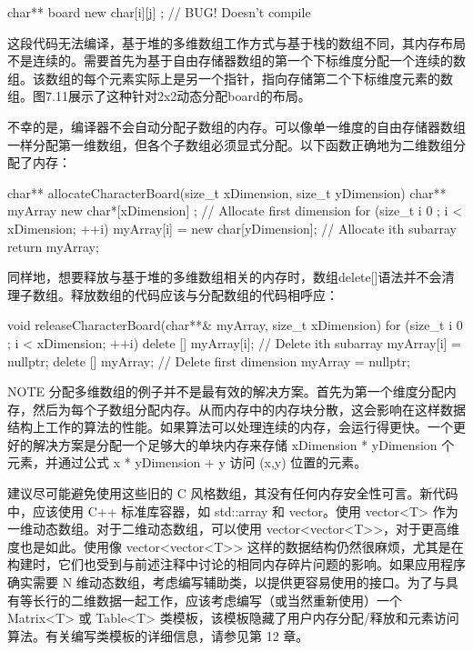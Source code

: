 \begin{cpp}
char** board { new char[i][j] }; // BUG! Doesn't compile
\end{cpp}

这段代码无法编译，基于堆的多维数组工作方式与基于栈的数组不同，其内存布局不是连续的。需要首先为基于自由存储器数组的第一个下标维度分配一个连续的数组。该数组的每个元素实际上是另一个指针，指向存储第二个下标维度元素的数组。图7.11展示了这种针对2x2动态分配board的布局。


不幸的是，编译器不会自动分配子数组的内存。可以像单一维度的自由存储器数组一样分配第一维数组，但各个子数组必须显式分配。以下函数正确地为二维数组分配了内存：

\begin{cpp}
char** allocateCharacterBoard(size_t xDimension, size_t yDimension)
{
    char** myArray { new char*[xDimension] }; // Allocate first dimension
    for (size_t i { 0 }; i < xDimension; ++i) {
        myArray[i] = new char[yDimension]; // Allocate ith subarray
    }
    return myArray;
}
\end{cpp}

同样地，想要释放与基于堆的多维数组相关的内存时，数组delete[]语法并不会清理子数组。释放数组的代码应该与分配数组的代码相呼应：

\begin{cpp}
void releaseCharacterBoard(char**& myArray, size_t xDimension)
{
    for (size_t i { 0 }; i < xDimension; ++i) {
        delete [] myArray[i]; // Delete ith subarray
        myArray[i] = nullptr;
    }
    delete [] myArray; // Delete first dimension
    myArray = nullptr;
}
\end{cpp}

\begin{myNotic}{NOTE}
分配多维数组的例子并不是最有效的解决方案。首先为第一个维度分配内存，然后为每个子数组分配内存。从而内存中的内存块分散，这会影响在这样数据结构上工作的算法的性能。如果算法可以处理连续的内存，会运行得更快。一个更好的解决方案是分配一个足够大的单块内存来存储 xDimension * yDimension 个元素，并通过公式 x * yDimension + y 访问 (x,y) 位置的元素。
\end{myNotic}

建议尽可能避免使用这些旧的 C 风格数组，其没有任何内存安全性可言。新代码中，应该使用 C++ 标准库容器，如 std::array 和 vector。使用 vector<T> 作为一维动态数组。对于二维动态数组，可以使用 vector<vector<T>{}>，对于更高维度也是如此。使用像 vector<vector<T>{}> 这样的数据结构仍然很麻烦，尤其是在构建时，它们也受到与前述注释中讨论的相同内存碎片问题的影响。如果应用程序确实需要 N 维动态数组，考虑编写辅助类，以提供更容易使用的接口。为了与具有等长行的二维数据一起工作，应该考虑编写（或当然重新使用）一个 Matrix<T> 或 Table<T> 类模板，该模板隐藏了用户内存分配/释放和元素访问算法。有关编写类模板的详细信息，请参见第 12 章。

